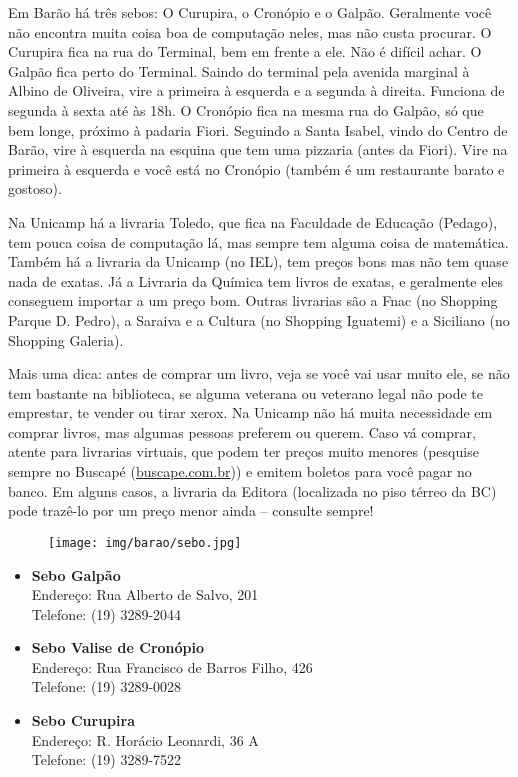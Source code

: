 Em Barão há três sebos: O Curupira, o Cronópio e o Galpão. Geralmente você não
encontra muita coisa boa de computação neles, mas não custa procurar. O
Curupira fica na rua do Terminal, bem em frente a ele. Não é difícil achar. O
Galpão fica perto do Terminal. Saindo do terminal pela avenida marginal à
Albino de Oliveira, vire a primeira à esquerda e a segunda à direita. Funciona
de segunda à sexta até às 18h. O Cronópio fica na mesma rua do Galpão, só que
bem longe, próximo à padaria Fiori. Seguindo a Santa Isabel, vindo do Centro de
Barão, vire à esquerda na esquina que tem uma pizzaria (antes da Fiori). Vire
na primeira à esquerda e você está no Cronópio (também é um restaurante barato
e gostoso).

Na Unicamp há a livraria Toledo, que fica na Faculdade de Educação (Pedago),
tem pouca coisa de computação lá, mas sempre tem alguma coisa de matemática.
Também há a livraria da Unicamp (no IEL), tem preços bons mas não tem quase
nada de exatas. Já a Livraria da Química tem livros de exatas, e geralmente
eles conseguem importar a um preço bom. Outras livrarias são a Fnac (no
Shopping Parque D. Pedro), a Saraiva e a Cultura (no Shopping Iguatemi) e a
Siciliano (no Shopping Galeria).

Mais uma dica: antes de comprar um livro, veja se você vai usar muito ele, se
não tem bastante na biblioteca, se alguma veterana ou veterano legal não pode
te emprestar, te vender ou tirar xerox. Na Unicamp não há muita necessidade em
comprar livros, mas algumas pessoas preferem ou querem. Caso vá comprar, atente
para livrarias virtuais, que podem ter preços muito menores (pesquise sempre no
Buscapé (\url{buscape.com.br})) e emitem boletos para você pagar no banco. Em
alguns casos, a livraria da Editora (localizada no piso térreo da BC) pode
trazê-lo por um preço menor ainda -- consulte sempre!

\begin{figure}[h!]
  \centering
  \texttt{[image: img/barao/sebo.jpg]}
\end{figure}

\begin{itemize}
\item \textbf{Sebo Galpão}
  \\Endereço: Rua Alberto de Salvo, 201
  \\Telefone: (19) 3289-2044

\item \textbf{Sebo Valise de Cronópio}
  \\Endereço: Rua Francisco de Barros Filho, 426
  \\Telefone: (19) 3289-0028

\item \textbf{Sebo Curupira}
  \\Endereço: R. Horácio Leonardi, 36 A
  \\Telefone: (19) 3289-7522
\end{itemize}


